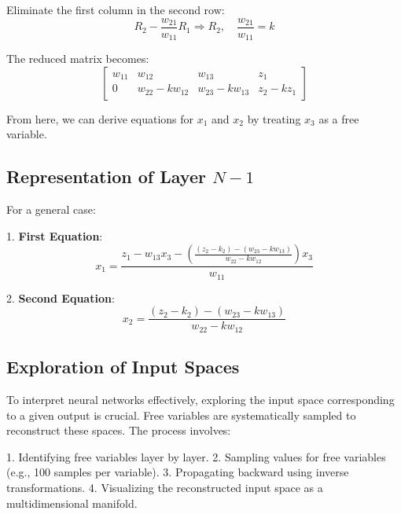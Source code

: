 \documentclass{article}
\begin{document}
Eliminate the first column in the second row:
\[
R_2 - \frac{w_{21}}{w_{11}} R_1 \Rightarrow R_2, \quad \frac{w_{21}}{w_{11}} = k
\]

The reduced matrix becomes:
\[
\begin{bmatrix}
w_{11} &w_{12} & w_{13} & z_1 \\
0 & w_{22} - kw_{12} & w_{23} - kw_{13} & z_2 - k z_1
\end{bmatrix}
\]

From here, we can derive equations for \(x_1\) and \(x_2\) by treating \(x_3\) as a free variable.

\subsection*{Representation of Layer \(N-1\)}

For a general case:

1. \textbf{First Equation}:
\[
x_1 = \frac{z_1 - w_{13} x_3 - \left( \frac{(z_2 - k_2)-(w_{23} - kw_{13})}{w_{22} - kw_{12}} \right) x_3}{w_{11}}
\]

2. \textbf{Second Equation}:
\[
x_2 = \frac{(z_2 - k_2)-(w_{23} - kw_{13})}{w_{22} - kw_{12}}
\]

\subsection*{Exploration of Input Spaces}

To interpret neural networks effectively, exploring the input space corresponding to a given output is crucial. Free variables are systematically sampled to reconstruct these spaces. The process involves:

1. Identifying free variables layer by layer.
2. Sampling values for free variables (e.g., 100 samples per variable).
3. Propagating backward using inverse transformations.
4. Visualizing the reconstructed input space as a multidimensional manifold.
\end{document}
